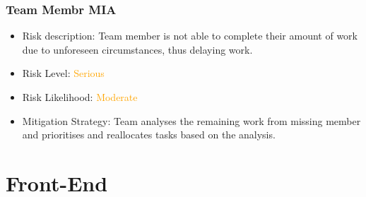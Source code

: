 \documentclass{article}
\begin{document}
\subsubsection{Team Membr MIA}
\begin{itemize}
    \item Risk description: Team member is not able to complete their amount of work due to unforeseen circumstances, thus delaying work. 
    \item Risk Level: \textcolor{orange}{Serious}
    \item Risk Likelihood: \textcolor{orange}{Moderate}
    \item Mitigation Strategy: Team analyses the remaining work from missing member and prioritises and reallocates tasks based on the analysis. 
\end{itemize}

\section{Front-End}
\end{document}
